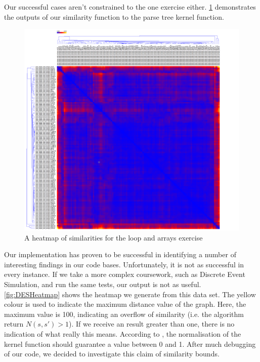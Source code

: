 Our successful cases aren't constrained to the one exercise either. 
\cref{fig:LoopsAndArraysHeatmap} 
demonstrates the outputs of our similarity function to the parse tree kernel
function.



\begin{figure}[h!]

	\centering
		\includegraphics[width=1.2\textwidth]{Figures/LoopArrayHeatmap}
	\caption{A heatmap of similarities for the loop and arrays exercise}
	\label{fig:LoopsAndArraysHeatmap}

\end{figure}




Our implementation has proven to be successful in identifying a number of
interesting findings in our code bases. Unfortunately, it is not as successful
in every instance. If we take a more complex coursework, such as Discrete
Event Simulation, and run the same tests, our output is not as useful. 
\cref{fig:DESHeatmap} shows the heatmap we generate from this data set. The
yellow colour is used to indicate the maximum distance value of the graph. Here,
the maximum value is 100, indicating an overflow of similarity (i.e. the algorithm
return $N(s, s') > 1$). If we receive an result greater than one, there is no
indication of what really this means. According to \cite{ParseTreeKernel},
the normalisation of the kernel function should guarantee a value between 0
and 1. After much debugging of our code, we decided to investigate this claim
of similarity bounds. 

